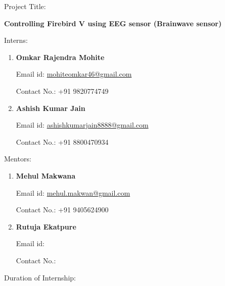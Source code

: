 \documentclass[14pt]{article}
\author{Omkar Mohite}
\title{}
\begin{document}
\begin{center}
{\Large Project Title:}
\end{center}

\begin{center}
{\Huge \textbf{Controlling Firebird V using EEG sensor (Brainwave sensor)}\\}
\end{center}

\begin{center}

\end{center}
\begin{center}
{\LARGE Interns:}

\begin{enumerate}
	\item {\LARGE \textbf{Omkar Rajendra Mohite}}


{\raggedright
{\Large Email id:
\href{mailto:mohiteomkar46@gmail.com}{mohiteomkar46@gmail.com}}
}

{\raggedright
{\Large Contact No.: +91 9820774749}
}


	\item {\LARGE \textbf{Ashish Kumar Jain}}


{\raggedright
{\Large Email id:
\href{mailto:ashishkumarjain8888@gmail.com}{ashishkumarjain8888@gmail.com}}
}


{\raggedright
{\Large Contact No.: +91 8800470934}
}
\end{enumerate}
\begin{center}
{\LARGE Mentors:}
\end{center}

\begin{enumerate}
	\item {\LARGE     \textbf{Mehul Makwana}}


{\raggedright
{\Large     Email id:
\href{mailto:mehul.makwan@gmail.com}{mehul.makwan@gmail.com}}
}

{\raggedright
{\Large     Contact No.: +91 9405624900}
}


	\item {\LARGE     \textbf{Rutuja Ekatpure}}


{\raggedright
{\LARGE     }{\Large Email id:}
}

{\raggedright
{\Large     Contact No.:}
}
\end{enumerate}
\end{center}
\begin{center}
{\large Duration of Internship:}
\end{center}
\end{document}
